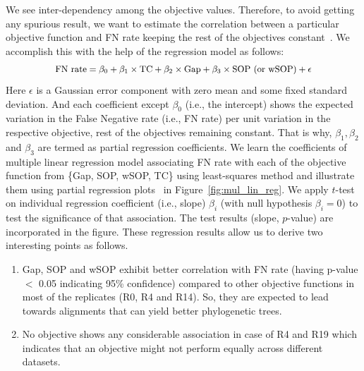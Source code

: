 We see inter-dependency among the objective values. Therefore, to avoid getting any spurious result, we want to estimate the correlation between a particular objective function and FN rate keeping the rest of the objectives constant~\citep{montgomery2012introduction}. We accomplish this with the help of the regression model as follows:
\begin{equation}
\small
\begin{split}
\text{FN rate} = \beta_0 + \beta_1 \times \text{TC}+ \beta_2 \times \text{Gap} + 
\beta_3 \times \text{SOP (or wSOP)} + \epsilon \label{eq:multi_lin_reg}
\end{split}
\end{equation}
Here $\epsilon$ is a Gaussian error component with zero mean and some fixed standard deviation. And each coefficient except $\beta_0$ (i.e., the intercept) shows the expected variation in the False Negative rate (i.e., FN rate) per unit variation in the respective objective, rest of the objectives remaining constant. That is why, $\beta_1, \beta_2$ and $\beta_3$ are termed as partial regression coefficients.  
We learn the coefficients of multiple linear regression model associating FN rate with each of the objective function from \{Gap, SOP, wSOP, TC\} using least-squares method and illustrate them using partial regression plots~\citep{montgomery2012introduction} in Figure~\ref{fig:mul_lin_reg}. We apply $t$-test on individual regression coefficient (i.e., slope) $\beta_i$ (with null hypothesis $\beta_i=0$) to test the significance of that association. The test results (slope, $p$-value) are incorporated in the figure.
 These regression results allow us to derive two interesting points as follows.
\begin{enumerate}
	\item Gap, SOP and wSOP exhibit better correlation with FN rate (having p-value $<$ 0.05 indicating 95\% confidence) compared to other objective functions in most of the replicates (R0, R4 and R14). So, they are expected to lead towards alignments that can yield better phylogenetic trees.
	\item No objective shows any considerable association in case of R4 and R19 which indicates that an objective might not perform equally across different datasets. 
\end{enumerate}

